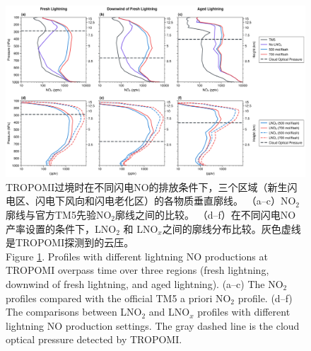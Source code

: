 \begin{figure}
    \centering
    \includegraphics[width=0.8\columnwidth]{./figures/china_nox_profile.png}
    \caption{
    TROPOMI过境时在不同闪电NO的排放条件下，三个区域（新生闪电区、闪电下风向和闪电老化区）的各物质垂直廓线。
    （a--c）NO$_2$廓线与官方TM5先验NO$_2$廓线之间的比较。
    （d--f）在不同闪电NO产率设置的条件下，LNO$_2$ 和 LNO$_x$之间的廓线分布比较。灰色虚线是TROPOMI探测到的云压。\\
     Figure \ref{fig:china_nox_profile}. Profiles with different lightning NO productions at TROPOMI overpass time over three regions (fresh lightning, downwind of fresh lightning, and aged lightning).
    (a--c) The NO$_2$ profiles compared with the official TM5 a priori NO$_2$ profile.
    (d--f) The comparisons between LNO$_2$ and LNO$_x$ profiles with different lightning NO production settings.
    The gray dashed line is the cloud optical pressure detected by TROPOMI.
    }
    \label{fig:china_nox_profile}
\end{figure}


